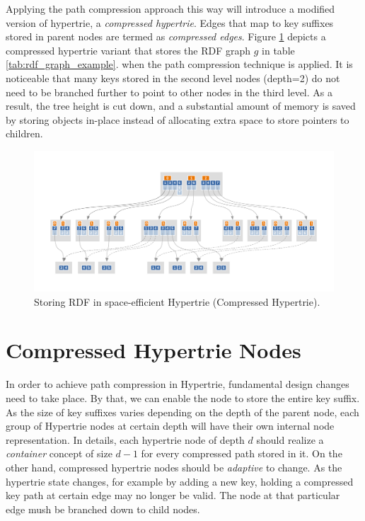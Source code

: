 Applying the path compression approach this way will introduce a modified version of hypertrie, a \textit{compressed hypertrie}. Edges that map to key suffixes stored in parent nodes are termed as \textit{compressed edges}. 
Figure \ref{fig:rdf_compressed_hypertrie} depicts a compressed hypertrie variant that stores the RDF graph $g$ in table \ref{tab:rdf_graph_example}.
when the path compression technique is applied. It is noticeable that many keys stored in the second level nodes (depth=2) do not need to be branched further to point to other nodes in the third level. 
As a result, the tree height is cut down, and a substantial amount of memory is saved by storing objects in-place instead of allocating extra space to store pointers to children. 

\begin{figure}
	\centering
	\includegraphics[scale=0.74]{figures/chapter4/compressedBHT}
	\caption{Storing RDF in space-efficient Hypertrie (Compressed Hypertrie).}
	\label{fig:rdf_compressed_hypertrie}
\end{figure}


\section{Compressed Hypertrie Nodes}
\label{sec:compressed_nodes_representation}
In order to achieve path compression in Hypertrie, fundamental design changes need to take place. By that, we can enable the node to store the entire key suffix.
As the size of key suffixes varies depending on the depth of the parent node, each group of Hypertrie nodes at certain depth will have their own internal node representation. In details, each hypertrie node of depth $d$ should realize a \textit{container} concept of size $d-1$ for every compressed path stored in it. On the other hand, compressed hypertrie nodes should be \textit{adaptive} to change. As the hypertrie state changes, for example by adding a new key, holding a compressed key path at certain edge may no longer be valid. The node at that particular edge mush be branched down to child nodes. \\

